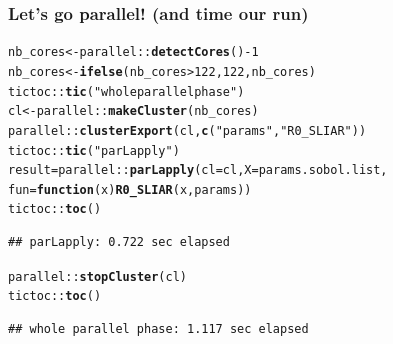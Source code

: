 \documentclass[aspectratio=169]{beamer}\usepackage[]{graphicx}\usepackage[]{xcolor}
\makeatletter
\newcommand{\hlnum}[1]{\textcolor[rgb]{0.686,0.059,0.569}{#1}}%
\newcommand{\hlsng}[1]{\textcolor[rgb]{0.192,0.494,0.8}{#1}}%
\newcommand{\hlopt}[1]{\textcolor[rgb]{0,0,0}{#1}}%
\newcommand{\hldef}[1]{\textcolor[rgb]{0.345,0.345,0.345}{#1}}%
\newcommand{\hlkwa}[1]{\textcolor[rgb]{0.161,0.373,0.58}{\textbf{#1}}}%
\newcommand{\hlkwb}[1]{\textcolor[rgb]{0.69,0.353,0.396}{#1}}%
\newcommand{\hlkwc}[1]{\textcolor[rgb]{0.333,0.667,0.333}{#1}}%
\newcommand{\hlkwd}[1]{\textcolor[rgb]{0.737,0.353,0.396}{\textbf{#1}}}%
\newenvironment{kframe}{%
 \def\at@end@of@kframe{}%
 \ifinner\ifhmode%
  \def\at@end@of@kframe{\end{minipage}}%
  \begin{minipage}{\columnwidth}%
 \fi\fi%
 \def\FrameCommand##1{\hskip\@totalleftmargin \hskip-\fboxsep
 \colorbox{shadecolor}{##1}\hskip-\fboxsep
     \hskip-\linewidth \hskip-\@totalleftmargin \hskip\columnwidth}%
 \MakeFramed {\advance\hsize-\width
   \@totalleftmargin\z@ \linewidth\hsize
   \@setminipage}}%
 {\par\unskip\endMakeFramed%
 \at@end@of@kframe}
\newenvironment{knitrout}{}{} %
\makeatother
\begin{document}
\begin{frame}[fragile]\frametitle{Let's go parallel! (and time our run)}
\begin{knitrout}
\color{fgcolor}\begin{kframe}
\begin{alltt}
\hldef{nb_cores} \hlkwb{<-} \hldef{parallel}\hlopt{::}\hlkwd{detectCores}\hldef{()} \hlopt{-} \hlnum{1}
\hldef{nb_cores} \hlkwb{<-} \hlkwd{ifelse}\hldef{(nb_cores} \hlopt{>} \hlnum{122}\hldef{,} \hlnum{122}\hldef{, nb_cores)}
\hldef{tictoc}\hlopt{::}\hlkwd{tic}\hldef{(}\hlsng{"whole parallel phase"}\hldef{)}
\hldef{cl} \hlkwb{<-} \hldef{parallel}\hlopt{::}\hlkwd{makeCluster}\hldef{(nb_cores)}
\hldef{parallel}\hlopt{::}\hlkwd{clusterExport}\hldef{(cl,} \hlkwd{c}\hldef{(}\hlsng{"params"}\hldef{,} \hlsng{"R0_SLIAR"}\hldef{))}
\hldef{tictoc}\hlopt{::}\hlkwd{tic}\hldef{(}\hlsng{"parLapply"}\hldef{)}
\hldef{result} \hlkwb{=} \hldef{parallel}\hlopt{::}\hlkwd{parLapply}\hldef{(}\hlkwc{cl} \hldef{= cl,} \hlkwc{X} \hldef{= params.sobol.list,}
                             \hlkwc{fun} \hldef{=}  \hlkwa{function}\hldef{(}\hlkwc{x}\hldef{)} \hlkwd{R0_SLIAR}\hldef{(x, params))}
\hldef{tictoc}\hlopt{::}\hlkwd{toc}\hldef{()}
\end{alltt}
\begin{verbatim}
## parLapply: 0.722 sec elapsed
\end{verbatim}
\begin{alltt}
\hldef{parallel}\hlopt{::}\hlkwd{stopCluster}\hldef{(cl)}
\hldef{tictoc}\hlopt{::}\hlkwd{toc}\hldef{()}
\end{alltt}
\begin{verbatim}
## whole parallel phase: 1.117 sec elapsed
\end{verbatim}
\end{kframe}
\end{knitrout}
\end{frame}
\end{document}
